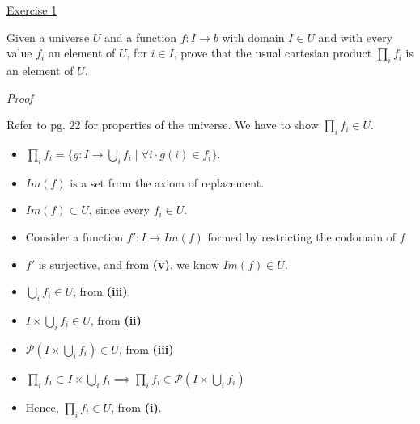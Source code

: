 \noindent
\underline{Exercise 1}
\vspace{2mm}

Given a universe $U$ and a function $f: I \to b$ with domain $I \in U$ and with
every value $f_i$ an element of $U$, for $i \in I$, prove that the usual
cartesian product $\prod_i f_i$ is an element of $U$.

\vspace{2mm}

\noindent
\emph{Proof}

Refer to pg. 22 for properties of the universe.
We have to show $\prod_i f_i \in U$. 

\begin{itemize}
    \item $\prod_i f_i = \{g : I \to \bigcup_i f_i \mid
        \forall i \cdot g(i) \in f_i \}$.
    \item $Im(f)$ is a set from the axiom of replacement.
    \item $Im(f) \subset U$, since every $f_i \in U$.
    \item Consider a function $f': I \to Im(f)$ formed by restricting the
        codomain of $f$
    \item $f'$ is surjective, and from \textbf{(v)}, we know $Im(f) \in U$.
    \item $\bigcup_i f_i \in U$, from \textbf{(iii)}.
    \item $I \times \bigcup_i f_i \in U$, from \textbf{(ii)}
    \item $\mathcal{P}(I \times \bigcup_i f_i) \in U$, from \textbf{(iii)}
    \item $\prod_i f_i \subset I \times \bigcup_i f_i \implies \prod_i f_i \in 
        \mathcal{P}(I \times \bigcup_i f_i)$ 
    \item Hence, $\prod_i f_i \in U$, from \textbf{(i)}.
\end{itemize}

\vspace{2mm}
